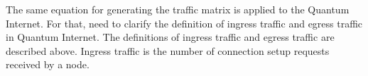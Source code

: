 The same equation for generating the traffic matrix is applied to the Quantum Internet. 
For that, need to clarify the definition of ingress traffic and egress traffic in Quantum Internet.
The definitions of ingress traffic and egress traffic are described above. 
Ingress traffic is the number of connection setup requests received by a node. 

